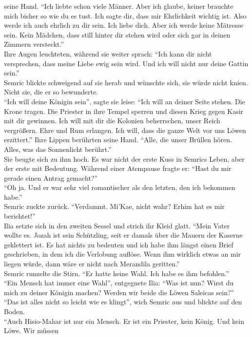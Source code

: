 seine Hand. ``Ich liebte schon viele Männer. Aber ich glaube, keiner brauchte mich bisher so 
wie du es tust. Ich sagte dir, dass mir Ehrlichkeit wichtig ist. Also werde ich auch ehrlich zu dir 
sein. Ich liebe dich. Aber ich werde keine Mätresse sein. Kein Mädchen, dass still hinter dir 
stehen wird oder sich gar in deinen Zimmern versteckt.''\\
Ihre Augen leuchteten, während sie weiter sprach: ``Ich kann dir nicht versprechen, dass meine 
Liebe ewig sein wird. Und ich will nicht nur deine Gattin sein.''\\
Semric blickte schweigend auf sie herab und wünschte sich, sie würde nicht knien. Nicht sie, die er 
so bewunderte.\\
``Ich will deine Königin sein'', sagte sie leise: ``Ich will an deiner Seite stehen. Die Krone 
tragen. Die Priester in ihre Tempel sperren und diesen Krieg gegen Kasir mit dir gewinnen. Ich will 
mit dir die Kolonien beherrschen, unser Reich vergrößern. Ehre und Rum erlangen. Ich will, dass die 
ganze Welt vor uns Löwen erzittert.'' Ihre Lippen berührten seine Hand. ``Alle, die unser Brüllen 
hören. Alles, was das Sonnenlicht berührt.''\\
Sie beugte sich zu ihm hoch. Es war nicht der erste Kuss in Semrics Leben, aber der erste mit 
Bedeutung. Während einer Atempause fragte er: ``Hast du mir gerade einen Antrag gemacht?''\\
``Oh ja. Und er war sehr viel romantischer als den letzten, den ich bekommen habe.''\\
Semric zuckte zurück. ``Verdammt. Mi'Kae, nicht wahr? Erhim hat es mir berichtet!''\\
Ilia setzte sich in den zweiten Sessel und strich ihr Kleid glatt. ``Mein Vater wollte es. Jozah 
ist sein Schützling, seit er damals über die Mauern der Kaserne geklettert ist. Es hat nichts zu 
bedeuten und ich habe ihm längst einen Brief geschrieben, in dem ich die Verlobung auflöse. Wenn 
ihm wirklich etwas an mir liegen würde, dann wäre er nicht nach Merandila geritten.''\\
Semric runzelte die Stirn. ``Er hatte keine Wahl. Ich habe es ihm befohlen.''\\
``Ein Mensch hat immer eine Wahl'', entgegnete Ilia: ``Was ist nun? Wirst du mich zu deiner Königin 
machen? Werden wir beide die Löwen Saleicas sein?''\\
``Das ist alles nicht so leicht wie es klingt'', wich Semric aus und blickte auf den Boden.\\
``Auch Hisio-Mahar ist nur ein Mensch. Er ist ein Priester, kein König. Und kein Löwe. Wir müssen 
